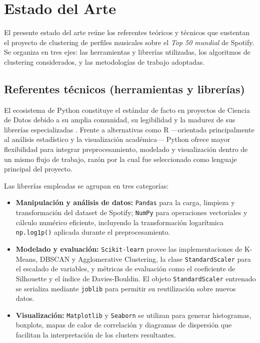\section{Estado del Arte}

El presente estado del arte reúne los referentes teóricos y técnicos que sustentan el proyecto de clustering de perfiles musicales sobre el \textit{Top 50 mundial} de Spotify. Se organiza en tres ejes: las herramientas y librerías utilizadas, los algoritmos de clustering considerados, y las metodologías de trabajo adoptadas.

\subsection{Referentes técnicos (herramientas y librerías)}

El ecosistema de Python constituye el estándar de facto en proyectos de Ciencia de Datos debido a su amplia comunidad, su legibilidad y la madurez de sus librerías especializadas \cite{vanderplas2016python}. Frente a alternativas como R ---orientada principalmente al análisis estadístico y la visualización académica--- Python ofrece mayor flexibilidad para integrar preprocesamiento, modelado y visualización dentro de un mismo flujo de trabajo, razón por la cual fue seleccionado como lenguaje principal del proyecto.

Las librerías empleadas se agrupan en tres categorías:

\begin{itemize}
    \item \textbf{Manipulación y análisis de datos:} \texttt{Pandas} \cite{mckinney2010data} para la carga, limpieza y transformación del dataset de Spotify; \texttt{NumPy} \cite{harris2020array} para operaciones vectoriales y cálculo numérico eficiente, incluyendo la transformación logarítmica \texttt{np.log1p()} aplicada durante el preprocesamiento.
    \item \textbf{Modelado y evaluación:} \texttt{Scikit-learn} \cite{pedregosa2011scikit} provee las implementaciones de K-Means, DBSCAN y Agglomerative Clustering, la clase \texttt{StandardScaler} para el escalado de variables, y métricas de evaluación como el coeficiente de Silhouette y el índice de Davies-Bouldin. El objeto \texttt{StandardScaler} entrenado se serializa mediante \texttt{joblib} para permitir su reutilización sobre nuevos datos.
    \item \textbf{Visualización:} \texttt{Matplotlib} \cite{hunter2007matplotlib} y \texttt{Seaborn} \cite{waskom2021seaborn} se utilizan para generar histogramas, boxplots, mapas de calor de correlación y diagramas de dispersión que facilitan la interpretación de los clusters resultantes.
\end{itemize}

